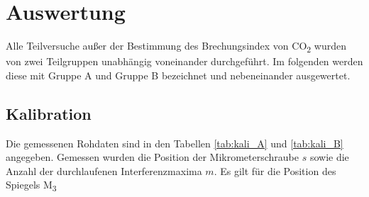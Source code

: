 \documentclass[12pt,a4paper]{article}
\begin{document}
\section{Auswertung}

Alle Teilversuche außer der Bestimmung des Brechungsindex von CO\textsubscript{2} wurden von zwei Teilgruppen unabhängig voneinander durchgeführt. Im folgenden werden diese mit \glqq Gruppe A \grqq und \glqq Gruppe B \grqq bezeichnet und nebeneinander ausgewertet.



\subsection{Kalibration}

Die gemessenen Rohdaten sind in den Tabellen \ref{tab:kali_A} und \ref{tab:kali_B} angegeben. Gemessen wurden die Position der Mikrometerschraube $s$ sowie die Anzahl der durchlaufenen Interferenzmaxima $m$. Es gilt für die Position des Spiegels M\textsubscript{3}
\end{document}
